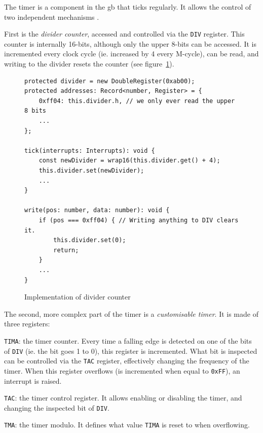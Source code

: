 \documentclass[11pt]{informatics-report}
\begin{document}
The timer is a component in the \gls{gb} that ticks regularly. It allows the control of two independent mechanisms \cite[Timer and Divider Registers]{pandoc}.

First is the \textit{divider counter}, accessed and controlled via the \texttt{DIV} register. This counter is internally 16-bits, although only the upper 8-bits can be accessed. It is incremented every clock cycle (ie. increased by 4 every M-cycle), can be read, and writing to the divider resets the counter (see figure~\ref{fig:div-timer}).

\begin{figure}[h]
    \begin{verbatim}
protected divider = new DoubleRegister(0xab00);
protected addresses: Record<number, Register> = {
	0xff04: this.divider.h, // we only ever read the upper 8 bits
	...
};

tick(interrupts: Interrupts): void {
	const newDivider = wrap16(this.divider.get() + 4);
	this.divider.set(newDivider);
	...
}

write(pos: number, data: number): void {
    if (pos === 0xff04) { // Writing anything to DIV clears it.
        this.divider.set(0);
        return;
    }
    ...
}
    \end{verbatim}
    \caption{Implementation of divider counter}
    \label{fig:div-timer}
\end{figure}

The second, more complex part of the timer is a \textit{customisable timer}. It is made of three registers:
\begin{compactitem}
	\item \texttt{TIMA}: the timer counter. Every time a falling edge is detected on one of the bits of \texttt{DIV} (ie. the bit goes 1 to 0), this register is incremented. What bit is inspected can be controlled via the \texttt{TAC} register, effectively changing the frequency of the timer. When this register overflows (is incremented when equal to \texttt{0xFF}), an interrupt is raised.
	\item \texttt{TAC}: the timer control register. It allows enabling or disabling the timer, and changing the inspected bit of \texttt{DIV}.
	\item \texttt{TMA}: the timer modulo. It defines what value \texttt{TIMA} is reset to when overflowing.
\end{compactitem}
\end{document}
